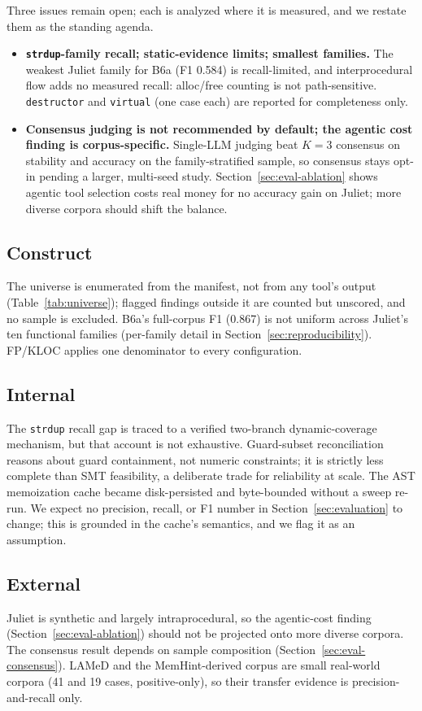 \documentclass[a4paper]{llncs}
\begin{document}
Three issues remain open; each is analyzed where it is measured, and
we restate them as the standing agenda.

\begin{itemize}
\item \textbf{\texttt{strdup}-family recall; static-evidence limits;
  smallest families.}   The weakest Juliet family for B6a (F1 0.584) is
  recall-limited, and interprocedural flow adds no measured recall:
  alloc/free counting is not path-sensitive.
  \texttt{destructor} and \texttt{virtual} (one case each) are reported
  for completeness only.
\item \textbf{Consensus judging is not recommended by default; the
  agentic cost finding is corpus-specific.} Single-LLM judging beat
  $K{=}3$ consensus on stability and accuracy on the
  family-stratified sample, so consensus stays opt-in pending a larger,
  multi-seed study. Section~\ref{sec:eval-ablation} shows agentic
  tool selection costs real money for no accuracy gain on Juliet;
  more diverse corpora should shift the balance.
\end{itemize}

\subsection{Construct}
The universe is enumerated from the manifest, not
from any tool's output (Table~\ref{tab:universe}); flagged findings
outside it are counted but unscored, and no sample is excluded.
B6a's
full-corpus F1 (0.867) is not uniform across Juliet's ten functional
families (per-family detail in Section~\ref{sec:reproducibility}).
FP/KLOC applies one denominator to every configuration.

\subsection{Internal}
The \texttt{strdup} recall gap is traced to a
verified two-branch dynamic-coverage mechanism, but that account is not
exhaustive. Guard-subset reconciliation reasons about guard containment,
not numeric constraints; it is strictly less complete than SMT
feasibility, a deliberate trade for reliability at scale. The AST
memoization cache became disk-persisted and byte-bounded without a sweep
re-run. We expect no precision, recall, or F1 number in
Section~\ref{sec:evaluation} to change; this is grounded in the
cache's semantics, and we flag it as an assumption.

\subsection{External}
Juliet is synthetic and largely intraprocedural, so the agentic-cost finding
(Section~\ref{sec:eval-ablation}) should not be projected onto more
diverse corpora. The consensus result depends on sample composition
(Section~\ref{sec:eval-consensus}). LAMeD and the MemHint-derived corpus
are small real-world corpora (41 and 19 cases, positive-only), so their
transfer evidence is precision-and-recall only.
\end{document}
